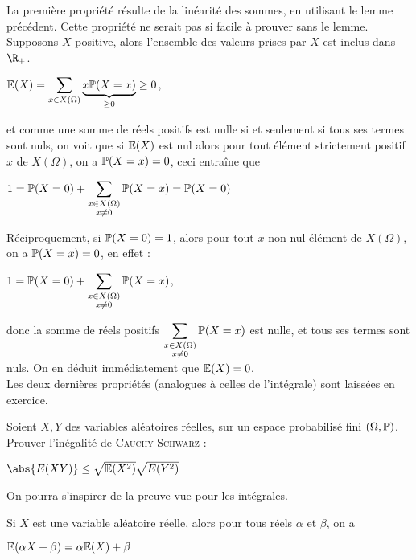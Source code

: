 \documentclass[12pt,a4paper]{report}
\begin{document}
\begin{demo}{}
La première propriété résulte de la linéarité des sommes, en utilisant le lemme précédent. Cette propriété ne serait pas si facile à prouver sans le lemme. \\

Supposons $X$ positive, alors l'ensemble des valeurs prises par $X$ est inclus dans $\R_+$.
\begin{center}
$\mathbb{E}(X) = \displaystyle \sum_{x \in X(\Omega)} \underbrace{x \mathbb{P}(X=x)}_{\ge 0} \ge 0$, 
\end{center}
et comme une somme de réels positifs est nulle si et seulement si tous ses termes sont nuls, on voit que si $\mathbb{E}(X)$ est nul alors pour tout élément strictement positif $x$ de $X(\Omega)$, on a $\mathbb{P}(X=x) = 0$, ceci entraîne que
\begin{center}
$1 = \mathbb{P}(X=0) + \displaystyle \sum_{\substack{x \in X(\Omega) \\ x \ne 0}} \mathbb{P}(X=x) = \mathbb{P}(X=0)$
\end{center}

Réciproquement, si $\mathbb{P}(X=0) = 1$, alors pour tout $x$ non nul élément de $X(\Omega)$, on a $\mathbb{P}(X=x) = 0$, en effet :
\begin{center}
$1 = \mathbb{P}(X=0) + \displaystyle \sum_{\substack{x \in X(\Omega) \\ x \ne 0}} \mathbb{P}(X=x)$,
\end{center}
donc la somme de réels positifs $\displaystyle \sum_{\substack{x \in X(\Omega) \\ x \ne 0}} \mathbb{P}(X=x)$ est nulle, et tous ses termes sont nuls. On en déduit immédiatement que $\mathbb{E}(X) = 0$. \\

Les deux dernières propriétés (analogues à celles de l'intégrale) sont laissées en exercice.
\end{demo}

\begin{exemple}[Exercice 12]{}
Soient $X,Y$ des variables aléatoires réelles, sur un espace probabilisé fini $(\Omega, \mathbb{P})$. Prouver l'inégalité de \textsc{Cauchy-Schwarz} :
\begin{center}
$\abs{E(XY)} \le \sqrt{\E(X^2)}\sqrt{E(Y^2)}$
\end{center}
On pourra s'inspirer de la preuve vue pour les intégrales.
\end{exemple}

\begin{corollaire}{}{}
Si $X$ est une variable aléatoire réelle, alors pour tous réels $\alpha$ et $\beta$, on a 
\begin{center}
$\mathbb{E}(\alpha X + \beta) = \alpha \mathbb{E}(X) + \beta$
\end{center}
\end{corollaire}
\end{document}
